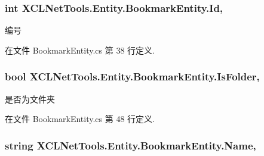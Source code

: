 \hypertarget{class_x_c_l_net_tools_1_1_entity_1_1_bookmark_entity_a827314c81aad0801f464f7359509baec}{
\subsubsection[{Id}]{\setlength{\rightskip}{0pt plus 5cm}int X\-C\-L\-Net\-Tools.\-Entity.\-Bookmark\-Entity.\-Id\hspace{0.3cm}{\ttfamily [get]}, {\ttfamily [set]}}}\label{class_x_c_l_net_tools_1_1_entity_1_1_bookmark_entity_a827314c81aad0801f464f7359509baec}


编号 



在文件 Bookmark\-Entity.\-cs 第 38 行定义.

\hypertarget{class_x_c_l_net_tools_1_1_entity_1_1_bookmark_entity_a025f1606c5b38103058567b3e08afe03}{
\subsubsection[{Is\-Folder}]{\setlength{\rightskip}{0pt plus 5cm}bool X\-C\-L\-Net\-Tools.\-Entity.\-Bookmark\-Entity.\-Is\-Folder\hspace{0.3cm}{\ttfamily [get]}, {\ttfamily [set]}}}\label{class_x_c_l_net_tools_1_1_entity_1_1_bookmark_entity_a025f1606c5b38103058567b3e08afe03}


是否为文件夹 



在文件 Bookmark\-Entity.\-cs 第 48 行定义.

\hypertarget{class_x_c_l_net_tools_1_1_entity_1_1_bookmark_entity_a89ccb517e285bfdd17981a72f590bc1c}{
\subsubsection[{Name}]{\setlength{\rightskip}{0pt plus 5cm}string X\-C\-L\-Net\-Tools.\-Entity.\-Bookmark\-Entity.\-Name\hspace{0.3cm}{\ttfamily [get]}, {\ttfamily [set]}}}\label{class_x_c_l_net_tools_1_1_entity_1_1_bookmark_entity_a89ccb517e285bfdd17981a72f590bc1c}


